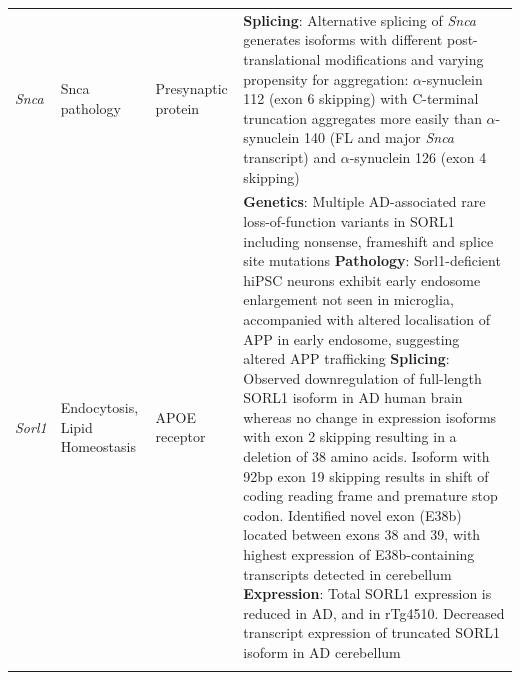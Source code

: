 \begin{changemargin}{1.5cm}
\begin{landscape}
\begin{longtable}[c]{p{1cm}p{2cm}p{4cm}p{19cm}}
			\centering \textit{Snca} &
			\centering Snca pathology  &
			\centering Presynaptic protein &
			\tabitem \textbf{Splicing}: Alternative splicing of \textit{Snca} generates isoforms with different post-translational modifications and varying propensity for aggregation: $\alpha$-synuclein 112 (exon 6 skipping) with C-terminal truncation aggregates more easily than $\alpha$-synuclein 140 (FL and major \textit{Snca} transcript) and $\alpha$-synuclein 126 (exon 4 skipping)\cite{Beyer2012, Beyer2006}  \\
			\hdashline[0.5pt/5pt]		
			
			\centering \textit{Sorl1} &
			\centering Endocytosis, Lipid Homeostasis  &
			\centering APOE receptor &
			\tabitem \textbf{Genetics}: Multiple AD-associated rare loss-of-function variants in SORL1 including nonsense, frameshift and splice site mutations \cite{Fernandez2016} \newline
			\tabitem \textbf{Pathology}: Sorl1-deficient hiPSC neurons exhibit early endosome enlargement not seen in microglia, accompanied with altered localisation of APP in early endosome, suggesting altered APP trafficking \cite{Knupp2020}\newline
			\tabitem \textbf{Splicing}: Observed downregulation of full-length SORL1 isoform in AD human brain whereas no change in expression isoforms with exon 2 skipping resulting in a deletion of 38 amino acids. Isoform with 92bp exon 19 skipping results in shift of coding reading frame and premature stop codon\cite{Grear2009}. Identified novel exon (E38b) located between exons 38 and 39, with highest expression of E38b-containing transcripts detected in cerebellum\cite{Monti2021} \newline
			\tabitem \textbf{Expression}: Total SORL1 expression is reduced in AD, and in rTg4510\cite{Sobue2021}. Decreased transcript expression of truncated SORL1 isoform in AD cerebellum \cite{Monti2021}\\
			\hdashline[0.5pt/5pt]	
			

\end{longtable}
\end{landscape}
\end{changemargin}
